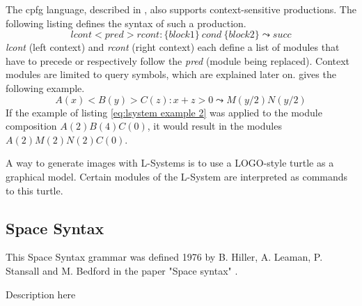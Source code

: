\documentclass[11pt, a4paper]{report}
\begin{document}
The cpfg language, described in \citep{PrusinkiewiczEtAl:2001}, also supports context-sensitive productions. The following listing defines the syntax of such a production.
\begin{equation} \label{eq:lsystem context sensitive}
    lcont < pred > rcont : \{block1\}\ cond\ \{block2\} \leadsto succ
\end{equation}
\textit{lcont} (left context) and \textit{rcont} (right context) each define a list of modules that have to precede or respectively follow the \textit{pred} (module being replaced). Context modules are limited to query symbols, which are explained later on. \citep{PrusinkiewiczEtAl:2001} gives the following example.
\begin{equation} \label{eq:lsystem example 2}
    A(x) < B(y) > C(z) : x + z > 0 \leadsto M(y / 2)N(y / 2)
\end{equation}
If the example of listing \ref{eq:lsystem example 2} was applied to the module composition $A(2)B(4)C(0)$, it would result in the modules $A(2)M(2)N(2)C(0)$.

A way to generate images with L-Systems is to use a LOGO-style turtle as a graphical model. Certain modules of the L-System are interpreted as commands to this turtle.

\pagebreak
\subsection{Space Syntax}
This Space Syntax grammar was defined 1976 by B. Hiller, A. Leaman, P. Stansall and M. Bedford in the paper "Space syntax" \citep{shapeGrammars:1972}.

Description here 
\end{document}
